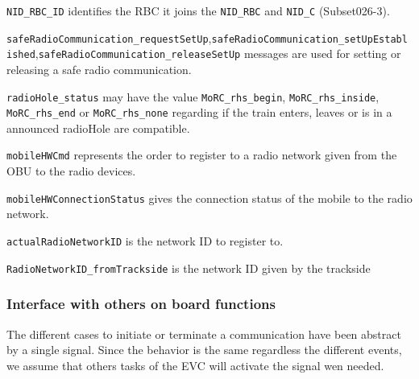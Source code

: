 \begin{description}
\item \verb+NID_RBC_ID+ identifies the RBC it joins the \verb+NID_RBC+ and
\verb+NID_C+ (Subset026-3).
\item \verb+safeRadioCommunication_requestSetUp+,\verb+safeRadioCommunication_setUpEstablished+,\verb+safeRadioCommunication_releaseSetUp+ messages are used for setting
or releasing a safe radio communication.
\item \verb+radioHole_status+ may have the value \verb+MoRC_rhs_begin+, \verb+MoRC_rhs_inside+,
\verb+MoRC_rhs_end+ or
\verb+MoRC_rhs_none+ regarding if the train enters, leaves or is in a announced radioHole 
are compatible.
\item \verb+mobileHWCmd+ represents the
  order to register to a radio network given from the OBU to the radio
  devices.
\item \verb+mobileHWConnectionStatus+  gives the connection status of the mobile
to the radio network.
\item  \verb+actualRadioNetworkID+ is the network ID to register to.
\item \verb+RadioNetworkID_fromTrackside+ is the network ID given by
  the trackside

\end{description}

\subsubsection{Interface with others on board functions}
The different cases to initiate or terminate a communication have been abstract
by a single signal. Since the behavior is the same regardless the different
events, we assume that others tasks of the EVC will activate the signal wen
needed.

